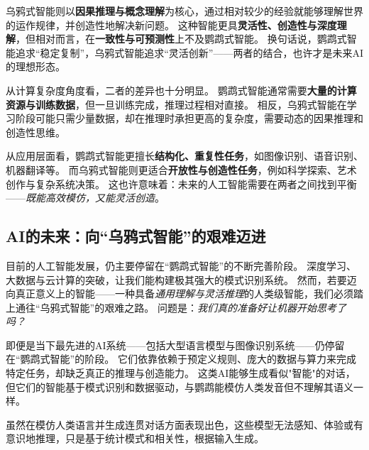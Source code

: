 
乌鸦式智能则以\textbf{因果推理与概念理解}为核心，通过相对较少的经验就能够理解世界的运作规律，并创造性地解决新问题。
这种智能更具\textbf{灵活性、创造性与深度理解}，但相对而言，在\textbf{一致性与可预测性}上不及鹦鹉式智能。  
换句话说，鹦鹉式智能追求“稳定复制”，乌鸦式智能追求“灵活创新”——两者的结合，也许才是未来AI的理想形态。  


从计算复杂度角度看，二者的差异也十分明显。  
鹦鹉式智能通常需要\textbf{大量的计算资源与训练数据}，但一旦训练完成，推理过程相对直接。  
相反，乌鸦式智能在学习阶段可能只需少量数据，却在推理时承担更高的复杂度，需要动态的因果推理和创造性思维。


从应用层面看，鹦鹉式智能更擅长\textbf{结构化、重复性任务}，如图像识别、语音识别、机器翻译等。  
而乌鸦式智能则更适合\textbf{开放性与创造性任务}，例如科学探索、艺术创作与复杂系统决策。  
这也许意味着：未来的人工智能需要在两者之间找到平衡——\emph{既能高效模仿，又能灵活创造}。  

\subsection{AI的未来：向“乌鸦式智能”的艰难迈进}

目前的人工智能发展，仍主要停留在“鹦鹉式智能”的不断完善阶段。  
深度学习、大数据与云计算的突破，让我们能构建极其强大的模式识别系统。  
然而，若要迈向真正意义上的智能——一种具备\emph{通用理解与灵活推理}的人类级智能，我们必须踏上通往“乌鸦式智能”的艰难之路。  
问题是：\emph{我们真的准备好让机器开始思考了吗？}  

即便是当下最先进的AI系统——包括大型语言模型与图像识别系统——仍停留在“鹦鹉式智能”的阶段。  
它们依靠依赖于预定义规则、庞大的数据与算力来完成特定任务，却缺乏真正的推理与创造能力。  
这类AI能够生成看似"智能"的对话，但它们的智能基于模式识别和数据驱动，与鹦鹉能模仿人类发音但不理解其语义一样。  

虽然在模仿人类语言并生成连贯对话方面表现出色，这些模型无法感知、体验或有意识地推理，只是基于统计模式和相关性，根据输入生成。

